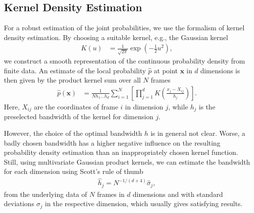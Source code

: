 \documentclass[12pt,a4paper,twoside,english,fleqn,preprint,aps,prb]{revtex4}
\newcommand{\xx}{\mathbf{x}}
\begin{document}
\subsection{Kernel Density Estimation}
For a robust estimation of the joint probabilities, we use the formalism of kernel density estimation.
By choosing a suitable kernel, e.g., the Gaussian kernel
\begin{align}
  K(u) &= \frac{1}{\sqrt{2\pi}} \exp(-\frac{1}{2} u^2),
\end{align}
we construct a smooth representation of the continuous probability density from finite data.
An estimate of the local probability $\hat{p}$ at point $\xx$ in $d$ dimensions is then given by the product kernel sum over all $N$ frames
\begin{align}
  \hat{p}(\xx) &= \frac{1}{N h_1 \dots h_d} \sum_{i=1}^{N}\left[ \prod_{j=1}^{d} K\left(\frac{x_j - X_{ij}}{h_j} \right)\right].
\end{align}
Here, $X_{ij}$ are the coordinates of frame $i$ in dimension $j$, while $h_j$ is the preselected bandwidth of the kernel for dimension $j$.

However, the choice of the optimal bandwidth $h$ is in general not clear.
Worse, a badly chosen bandwidth has a higher negative influence on the resulting probability density estimation
than an inappropriately chosen kernel function.
Still, using multivariate Gaussian product kernels, we can estimate the bandwidth for each dimension
using Scott's rule of thumb
\begin{align}
  \hat{h}_j = N^{-1/(d+4)} \hat{\sigma}_j,
\end{align}
from the underlying data of $N$ frames in $d$ dimensions and with standard deviations $\sigma_j$ in the respective dimension,
which usually gives satisfying results.
\end{document}
